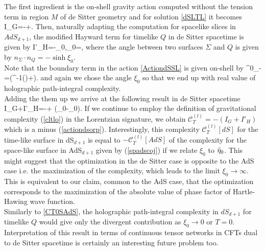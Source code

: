 \documentclass[a4paper,12pt]{article}
\begin{document}
The first ingredient is the on-shell gravity action computed without the tension term in region $M$ of de Sitter geometry and for solution \eqref{dSLTL} it becomes
\be
I_G=-+.
\ee
Then, naturally adapting the computation for spacelike slices in $AdS_{d+1}$, the modified Hayward term for timelike $Q$ in de Sitter spacetime is given by 
\be
I'_H=-\xi_0,\qquad \sinh\xi_0=,\label{etaTLdS}
\ee
where the angle between two surfaces $\Sigma$ and $Q$ is given by 
$n_\Sigma\cdot n_{Q}=-\sinh\xi_0$.\\
Note that the boundary term in the action \eqref{ActiondSSL} is given on-shell by
\be
{}^0_{-\infty}=\left(\sinh^{-1}\left(\right)+\right).  \label{dstimpa}
\ee
and again we chose the angle $\xi_0$ so that we end up with real value of holographic path-integral complexity.\\
Adding the them  up we arrive at the following result in de Sitter spacetime
\be
I_G+I'_H=-+
(\tanh\xi_0-\xi_0).  \label{actiondsorp}
\ee
If we continue to employ the definition of gravitational complexity (\ref{cltlo}) in the Lorentzian signature,
we obtain $\mathcal{C}^{(l)}_T=-(I_G+I'_H)$ which is a minus (\ref{actiondsorp}). Interestingly, 
this complexity  $\mathcal{C}^{(l)}_T[dS]$ for the time-like surface in  dS$_{d+1}$ is equal to $-\mathcal{C}^{(l)}_T[AdS]$ of the complexity for the space-like surface in AdS$_{d+1}$ given by (\ref{spadscoj}) if we relate $\xi_0$ to $\tilde{\eta}_0$.
This might suggest that the optimization 
in the de Sitter case is opposite to the AdS case i.e. the maximization of the complexity, which leads to
the limit $\xi_0\to \infty$. This is equivalent to our claim, common to the AdS case, that the optimization 
corresponds to the maximization of the absolute value of phase factor of Hartle-Hawing wave function.\\
Similarly to \eqref{CT0SAdS}, the holographic path-integral complexity in $dS_{d+1}$ for timelike $Q$ would give only the divergent contribution as $\xi_0\to 0$ or $T=0$. Interpretation of this result in terms of continuous tensor networks in CFTs dual to de Sitter spacetime is certainly an interesting future problem too. 
\end{document}
